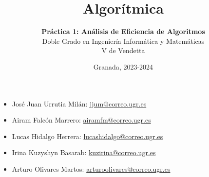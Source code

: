 \documentclass[12pt]{article}
\newcommand{\email}[1]{\href{mailto:#1}{{{\color{blue}#1}}}}
\begin{document}

    \pretitle{\begin{center}\bfseries\fontsize{42}{56}\selectfont}
    \posttitle{\par\end{center}\vspace{2em}}

    \preauthor{\begin{center}\Large}
    \postauthor{\par\end{center}\vspace{3em}}
    
    \predate{\begin{center}\huge}
    \postdate{\par\end{center}\vspace{5em}}
    
    \title{Algorítmica}
    \author{{\LARGE\textbf{Práctica 1: Análisis de Eficiencia de Algoritmos}}\\
    \vspace{1cm}Doble Grado en Ingeniería Informática y Matemáticas\\
    \vspace{1cm}V de Vendetta}
    \date{Granada, 2023-2024}
    \thispagestyle{empty}               %
    \maketitle
    \vfill
    

    \begin{itemize}
        \item[]José Juan Urrutia Milán:
        \email{jjum@correo.ugr.es}

        \item[]Airam Falcón Marrero:
        \email{airamfm@correo.ugr.es}

        \item[]Lucas Hidalgo Herrera:
        \email{lucashidalgo@correo.ugr.es}

        \item[]Irina Kuzyshyn Basarab:
        \email{kuzirina@correo.ugr.es}

        \item[]Arturo Olivares Martos:
        \email{arturoolivares@correo.ugr.es}
    \end{itemize}
    \newpage
\end{document}
